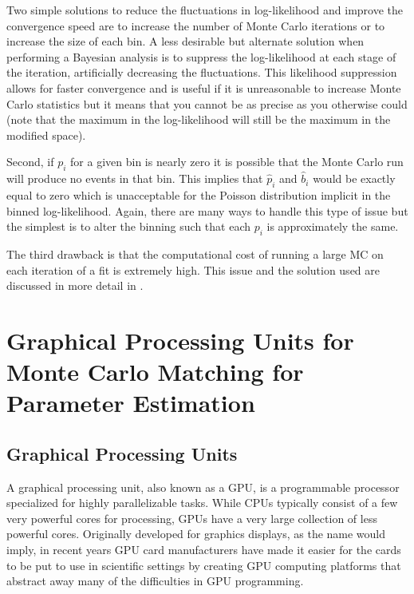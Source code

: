 Two simple solutions to reduce the fluctuations in log-likelihood and improve the convergence speed are to increase the number of Monte Carlo iterations or to increase the size of each bin.  A less desirable but alternate solution when performing a Bayesian analysis is to suppress the log-likelihood at each stage of the iteration, artificially decreasing the fluctuations.  This likelihood suppression allows for faster convergence and is useful if it is unreasonable to increase Monte Carlo statistics but it means that you cannot be as precise as you otherwise could (note that the maximum in the log-likelihood will still be the maximum in the modified space).

Second, if $p_i$ for a given bin is nearly zero it is possible that the Monte Carlo run will produce no events in that bin.  This implies that $\hat{p}_i$ and $\hat{b}_i$ would be exactly equal to zero which is unacceptable for the Poisson distribution implicit in the binned log-likelihood.  Again, there are many ways to handle this type of issue but the simplest is to alter the binning such that each $p_i$ is approximately the same. 

The third drawback is that the computational cost of running a large MC on each iteration of a fit is extremely high.  This issue and the solution used are discussed in more detail in .



\section{Graphical Processing Units for Monte Carlo Matching for Parameter Estimation}
\label{sec:gpu_gpu_fast_mc}

\subsection{Graphical Processing Units}

A graphical processing unit, also known as a GPU, is a programmable processor specialized for highly parallelizable tasks.  While CPUs typically consist of a few very powerful cores for processing, GPUs have a very large collection of less powerful cores.  Originally developed for graphics displays, as the name would imply, in recent years GPU card manufacturers have made it easier for the cards to be put to use in scientific settings by creating GPU computing platforms that abstract away many of the difficulties in GPU programming.  

